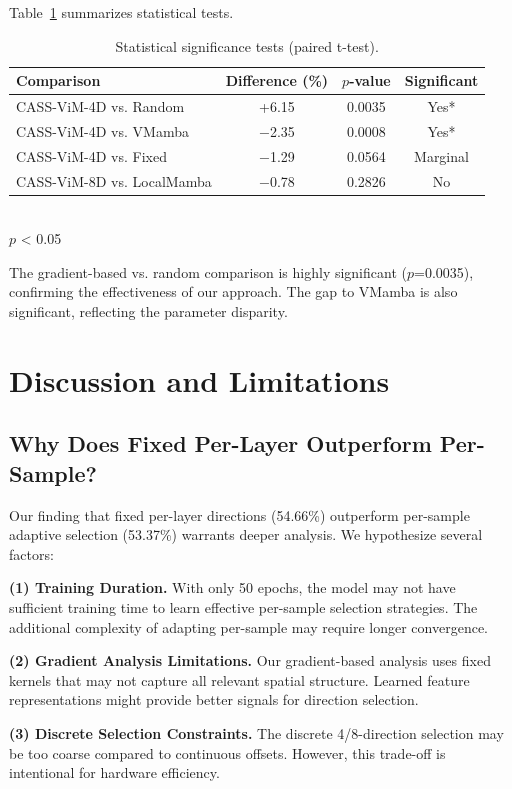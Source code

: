 \documentclass{article}
\begin{document}
Table~\ref{tab:significance} summarizes statistical tests.

\begin{table}[t]
\caption{Statistical significance tests (paired t-test).}
\label{tab:significance}
\centering
\begin{tabular}{lccc}
\toprule
Comparison & Difference (\%) & $p$-value & Significant \\
\midrule
CASS-ViM-4D vs. Random & +6.15 & 0.0035 & Yes* \\
CASS-ViM-4D vs. VMamba & $-$2.35 & 0.0008 & Yes* \\
CASS-ViM-4D vs. Fixed & $-$1.29 & 0.0564 & Marginal \\
CASS-ViM-8D vs. LocalMamba & $-$0.78 & 0.2826 & No \\
\bottomrule
\end{tabular}
\\{\small * $p$ < 0.05}
\end{table}

The gradient-based vs. random comparison is highly significant ($p$=0.0035), confirming the effectiveness of our approach. The gap to VMamba is also significant, reflecting the parameter disparity.

\section{Discussion and Limitations}
\label{sec:discussion}

\subsection{Why Does Fixed Per-Layer Outperform Per-Sample?}

Our finding that fixed per-layer directions (54.66\%) outperform per-sample adaptive selection (53.37\%) warrants deeper analysis. We hypothesize several factors:

\textbf{(1) Training Duration.} With only 50 epochs, the model may not have sufficient training time to learn effective per-sample selection strategies. The additional complexity of adapting per-sample may require longer convergence.

\textbf{(2) Gradient Analysis Limitations.} Our gradient-based analysis uses fixed kernels that may not capture all relevant spatial structure. Learned feature representations might provide better signals for direction selection.

\textbf{(3) Discrete Selection Constraints.} The discrete 4/8-direction selection may be too coarse compared to continuous offsets. However, this trade-off is intentional for hardware efficiency.
\end{document}
